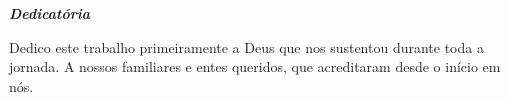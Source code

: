 \clearpage

\vspace*{0.75\textheight}

\begin{flushright}
  \emph{\bfseries Dedicatória}
\end{flushright}
\begin{flushleft}
  Dedico este trabalho primeiramente a Deus que nos sustentou durante toda a jornada. A nossos familiares e entes queridos, que acreditaram desde o início em nós.
\end{flushleft}